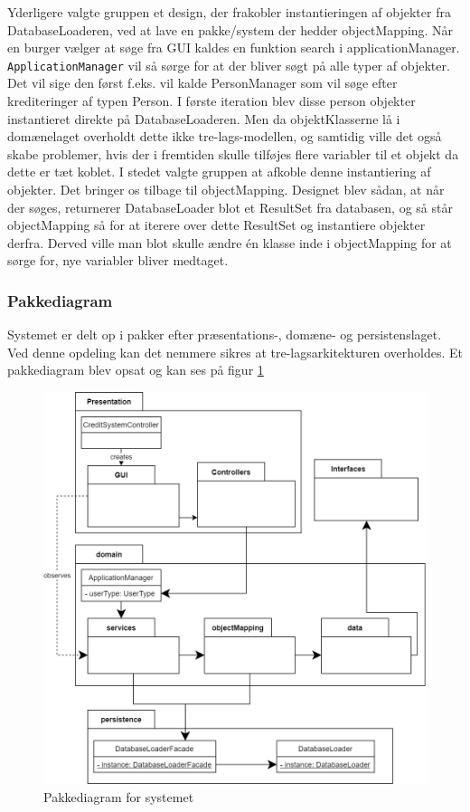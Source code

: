 Yderligere valgte gruppen et design, der frakobler instantieringen af objekter
fra DatabaseLoaderen, ved at lave en pakke/system der hedder objectMapping. Når
en burger vælger at søge fra GUI kaldes en funktion search i applicationManager.
\texttt{ApplicationManager} vil så sørge for at der bliver søgt på alle typer af
objekter. Det vil sige den først f.eks. vil kalde PersonManager som vil søge
efter krediteringer af typen Person. I første iteration blev disse person
objekter instantieret direkte på DatabaseLoaderen. Men da objektKlasserne lå i
domænelaget overholdt dette ikke  tre-lags-modellen, og samtidig ville det også
skabe problemer, hvis der i fremtiden skulle tilføjes flere variabler til et
objekt da dette er tæt koblet. I stedet valgte gruppen at afkoble denne
instantiering af objekter. Det bringer os tilbage til objectMapping. Designet
blev sådan, at når der søges, returnerer DatabaseLoader blot et ResultSet fra
databasen, og så står objectMapping så for at iterere over dette ResultSet og
instantiere objekter derfra. Derved ville man blot skulle ændre én klasse inde i
objectMapping for at sørge for, nye variabler bliver medtaget.


\subsubsection{Pakkediagram} Systemet er delt op i pakker efter præsentations-,
domæne- og persistenslaget. Ved denne opdeling kan det nemmere sikres at
tre-lagsarkitekturen overholdes. Et pakkediagram blev opsat og kan ses på figur
\ref{fig:PackageDiagram}

\begin{figure}[H]
    \centering
\includegraphics[scale = 0.26]{images/PackageDiagram.png}
    \caption{Pakkediagram for systemet}
    \label{fig:PackageDiagram}
\end{figure}

